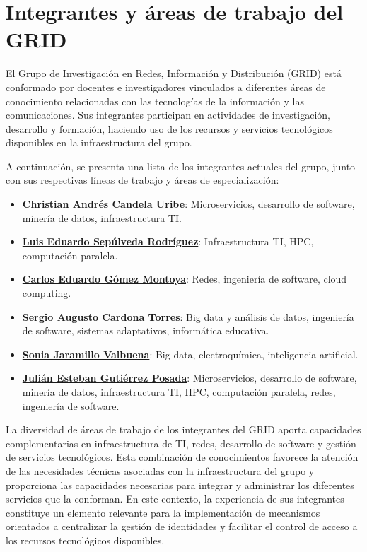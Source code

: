 \section{Integrantes y áreas de trabajo del \texorpdfstring{\ac{GRID}}{GRID}}

El Grupo de Investigación en Redes, Información y Distribución (\ac{GRID}) está conformado por docentes e investigadores vinculados a diferentes áreas de conocimiento relacionadas con las tecnologías de la información y las comunicaciones. Sus integrantes participan en actividades de investigación, desarrollo y formación, haciendo uso de los recursos y servicios tecnológicos disponibles en la infraestructura del grupo.

A continuación, se presenta una lista de los integrantes actuales del grupo, junto
con sus respectivas líneas de trabajo y áreas de especialización:

\begin{itemize}
	\item \href{https://scienti.minciencias.gov.co/cvlac/visualizador/generarCurriculoCv.do?cod_rh=0000210897}{\textbf{Christian Andrés Candela Uribe}}: Microservicios, desarrollo de software, minería de datos, infraestructura \ac{TI}.
	\item \href{https://scienti.minciencias.gov.co/cvlac/visualizador/generarCurriculoCv.do?cod_rh=0001383939}{\textbf{Luis Eduardo Sepúlveda Rodríguez}}: Infraestructura \ac{TI}, \ac{HPC}, computación paralela.
	\item \href{https://scienti.minciencias.gov.co/cvlac/visualizador/generarCurriculoCv.do?cod_rh=0001343801}{\textbf{Carlos Eduardo Gómez Montoya}}: Redes, ingeniería de software, cloud computing.
	\item \href{https://scienti.minciencias.gov.co/cvlac/visualizador/generarCurriculoCv.do?cod_rh=0001398775}{\textbf{Sergio Augusto Cardona Torres}}: Big data y análisis de datos, ingeniería de software, sistemas adaptativos, informática educativa.
	\item \href{https://scienti.minciencias.gov.co/cvlac/visualizador/generarCurriculoCv.do?cod_rh=0000193550}{\textbf{Sonia Jaramillo Valbuena}}: Big data, electroquímica, inteligencia artificial.
	\item \href{https://scienti.minciencias.gov.co/cvlac/visualizador/generarCurriculoCv.do?cod_rh=0000283495}{\textbf{Julián Esteban Gutiérrez Posada}}: Microservicios, desarrollo de software, minería de datos, infraestructura \ac{TI}, \ac{HPC}, computación paralela, redes, ingeniería de software.
\end{itemize}

La diversidad de áreas de trabajo de los integrantes del \ac{GRID} aporta capacidades complementarias en infraestructura de \ac{TI}, redes, desarrollo de software y gestión de servicios tecnológicos. Esta combinación de conocimientos favorece la atención de las necesidades técnicas asociadas con la infraestructura del grupo y proporciona las capacidades necesarias para integrar y administrar los diferentes servicios que la conforman. En este contexto, la experiencia de sus integrantes constituye un elemento relevante para la implementación de mecanismos orientados a centralizar la gestión de identidades y facilitar el control de acceso a los recursos tecnológicos disponibles.
